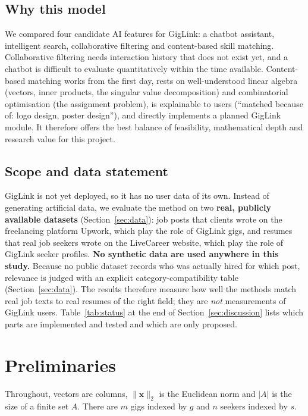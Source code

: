 \documentclass[12pt,a4paper]{article}
\numberwithin{equation}{section}
\theoremstyle{definition}
\theoremstyle{plain}
\begin{document}
\subsection{Why this model}
We compared four candidate AI features for GigLink: a chatbot assistant, intelligent search, collaborative filtering and content-based skill matching. Collaborative filtering needs interaction history that does not exist yet, and a chatbot is difficult to evaluate quantitatively within the time available. Content-based matching works from the first day, rests on well-understood linear algebra (vectors, inner products, the singular value decomposition) and combinatorial optimisation (the assignment problem), is explainable to users (\enquote{matched because of: logo design, poster design}), and directly implements a planned GigLink module. It therefore offers the best balance of feasibility, mathematical depth and research value for this project.

\subsection{Scope and data statement}
GigLink is not yet deployed, so it has no user data of its own. Instead of generating artificial data, we evaluate the method on two \textbf{real, publicly available datasets} (Section~\ref{sec:data}): job posts that clients wrote on the freelancing platform Upwork, which play the role of GigLink gigs, and resumes that real job seekers wrote on the LiveCareer website, which play the role of GigLink seeker profiles. \textbf{No synthetic data are used anywhere in this study.} Because no public dataset records who was actually hired for which post, relevance is judged with an explicit category-compatibility table (Section~\ref{sec:data}). The results therefore measure how well the methods match real job texts to real resumes of the right field; they are \emph{not} measurements of GigLink users. Table~\ref{tab:status} at the end of Section~\ref{sec:discussion} lists which parts are implemented and tested and which are only proposed.

\section{Preliminaries}\label{sec:prelim}

Throughout, vectors are columns, $\|\bm{x}\|_2$ is the Euclidean norm and $|A|$ is the size of a finite set $A$. There are $m$ gigs indexed by $g$ and $n$ seekers indexed by $s$.
\end{document}
